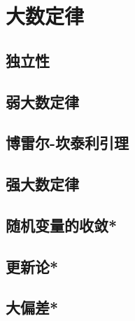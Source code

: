 \documentclass[main.tex]{subfiles}
\begin{document}
\chapter{大数定律}
\section{独立性} \label{sec:2.1}
\section{弱大数定律} \label{sec:2.2}
\section{博雷尔-坎泰利引理} \label{sec:2.3}
\section{强大数定律} \label{sec:2.4}
\section{随机变量的收敛*} \label{sec:2.5}
\section{更新论*} \label{sec:2.6}
\section{大偏差*} \label{sec:2.7}
\end{document}
